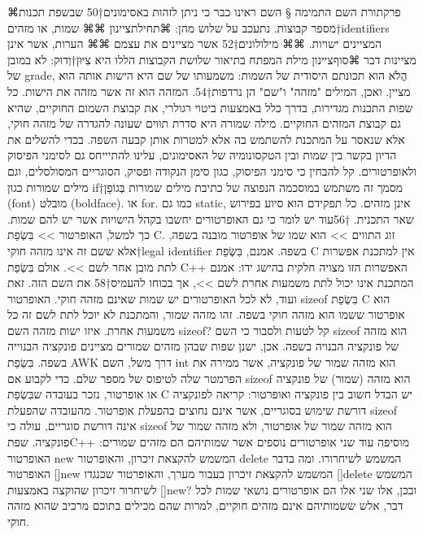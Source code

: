   ⌘פרק{תורת השם התמימה}
§      השם
      ראינו כבר כי ניתן לזהות באסימונים†{50} שבשפת תכנות מספר קבוצות. נתעכב על שלוש מהן:
      ⌘תחילת{ציינון}
      ⌘⌘ שמות, או מזהים†{identifiers} המציינים ישויות.
      ⌘⌘ מילולונים†{52} אשר מציינים את עצמם
      ⌘⌘ הערות, אשר אינן מציינות דבר
    ⌘סוף{ציינון}
      מילת המפתח בתיאור שלושת הקבוצות הללו היא צִיּוּן†{וְדוּק: לא במובן של grade}, הֲלֹא הוא תכונתם היסודית של השמות: משמעותו של שם היא הישות אותה הוא מציין. ואכן, המילים "מזהה" ו"שם" הן נרדפות†{54}. המזהה הוא זה אשר מזהה את הישות.
      כל שפות התכנות מגדירות, בדרך כלל באמצעות ביטוי רגולרי, את קבוצת השמום החוקיים, שהיא גם קבוצת המזהים החוקיים. מילה שמורה היא סדרת תווים שעונה להגדרה של מזהה חוקי, אלא שנאסר על המתכנת להשתמש בה אלא למטרות אותן קבעה השפה.
      בכדי להשלים את הדיון בקשר בין שמות ובין הטקסונומיה של האסימונים, עלינו להתיייחס גם לסימני הפיסוק ולאופרטורים. קל להבחין כי סימני הפיסוק, כגון סימן הנקודה ופסיק, הסוגריים המסולסלים, וגם מילים שמורות כגון if†{מסמך זה משתמש במוסכמה הנפוצה של כתיבת מילים שמורות בְּגוֹפָן (font) מובלט (boldface).} או for. כמו גם static, אינן מזהים. כל תפקידם הוא סיוע בפירוש שאר התכנית.
†{56}עוד יש לומר כי גם האופרטורים יחשבו בקהל הישויות אשר יש להם שמות. כך למשל, האופרטור >> בִּשְׂפַת C. זוג התווים >> הוא שמו של אופרטור מובנה בשפה, אלא ששם זה אינו מזהה חוקי†{legal identifier} בשפה. אמנם, בִּשְׂפַת C אין למתכנת אפשרות לתת מובן אחר לשם >>. אולם בִּשְׂפַת C++ האפשרות הזו מצויה חלקית בהישג ידו: אמנם המתכנת אינו יכול לתת משמעות אחרת לשם >>, אך בכוחו להעמיס†{58} את השם הזה. זאת ועוד, לא לכל האופרטורים יש שמות שאינם מזהה חוקי. האופרטור sizeof בִּשְׂפַת C הוא אופרטור ששמו הוא מזהה חוקי בשפה. זהו מזהה שמור, והמתכנת לא יוכל לתת לשם זה כל משמעות אחרת.
      איזו ישות מזהה השם sizeof? קל לטעות ולסבור כי השם sizeof הוא מזהה של פונקציה הבנויה בשפה. אכן, ישנן שפות שבהן מזהים שמורים מציינים פונקציה הבנוייה בשפה. בִּשְׂפַת AWK דרך משל, השם int הוא מזהה שמור של פונקציה, אשר ממירה את הפרמטר שלה לטיפוס של מספר שלם.
      כדי לקבוע אם sizeof הוא מזהה (שמור) של פונקציה או אופרטור, נזכר בעובדה שבִּשְׂפַת C יש הבדל חשוב בין פונקציה ואופרטור: קריאה לפונקציה דורשת שימוש בסוגריים, אשר אינם נחוצים בהפעלת אופרטור. מהעובדה שהפעלת sizeof אינה דורשת סוגריים, עולה כי sizeof הוא מזהה שמור של אופרטור, ולא מזהה שמור של פונקציה.
      שפתC++ מוסיפה עוד שני אופרטורים נוספים אשר שמותיהם הם מזהים שמורים: האופרטור new המשמש להקצאת זיכרון, והאופרטור delete המשמש לשיחרורו. ומה בדבר האופרטור []new המשמש להקצאת זיכרון בעבור מערך, והאופרטור שכנגדו []delete המשמש לשיחרור זיכרון שהוקצה באמצעות []new? ובכן, אלו שני אלו הם אופרטורים נושאי שמות לכל דבר, אלש ששמותיהם אינם מזהים חוקיים, למרות שהם מכילים בתוכם מרכיב שהוא מזהה חוקי.
